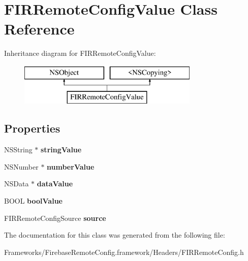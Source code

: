 \hypertarget{interface_f_i_r_remote_config_value}{}\section{F\+I\+R\+Remote\+Config\+Value Class Reference}
\label{interface_f_i_r_remote_config_value}
Inheritance diagram for F\+I\+R\+Remote\+Config\+Value\+:\begin{figure}[H]
\begin{center}
\leavevmode
\includegraphics[height=2.000000cm]{interface_f_i_r_remote_config_value}
\end{center}
\end{figure}
\subsection*{Properties}
\begin{DoxyCompactItemize}
\item 
\hypertarget{interface_f_i_r_remote_config_value_a0e16b1788a9fdf581a03606446f78599}{}N\+S\+String $\ast$ {\bfseries string\+Value}\label{interface_f_i_r_remote_config_value_a0e16b1788a9fdf581a03606446f78599}

\item 
\hypertarget{interface_f_i_r_remote_config_value_a5f511ec508aca53106ce39273b9c09be}{}N\+S\+Number $\ast$ {\bfseries number\+Value}\label{interface_f_i_r_remote_config_value_a5f511ec508aca53106ce39273b9c09be}

\item 
\hypertarget{interface_f_i_r_remote_config_value_ae1e8265617ab963075f0b7c85b50eb56}{}N\+S\+Data $\ast$ {\bfseries data\+Value}\label{interface_f_i_r_remote_config_value_ae1e8265617ab963075f0b7c85b50eb56}

\item 
\hypertarget{interface_f_i_r_remote_config_value_a91c0cba399c9fe746fee6c4a1ec48921}{}B\+O\+O\+L {\bfseries bool\+Value}\label{interface_f_i_r_remote_config_value_a91c0cba399c9fe746fee6c4a1ec48921}

\item 
\hypertarget{interface_f_i_r_remote_config_value_a5c137a54a987ce0e23e32e9b8452ad31}{}F\+I\+R\+Remote\+Config\+Source {\bfseries source}\label{interface_f_i_r_remote_config_value_a5c137a54a987ce0e23e32e9b8452ad31}

\end{DoxyCompactItemize}


The documentation for this class was generated from the following file\+:\begin{DoxyCompactItemize}
\item 
Frameworks/\+Firebase\+Remote\+Config.\+framework/\+Headers/F\+I\+R\+Remote\+Config.\+h\end{DoxyCompactItemize}
